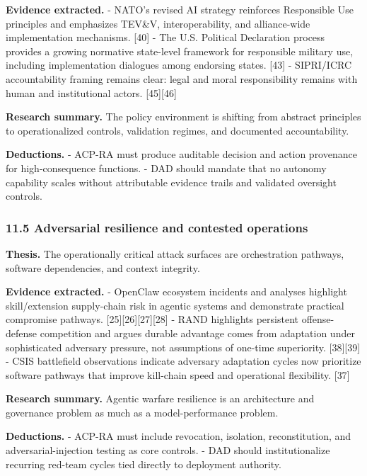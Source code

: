 \documentclass[11pt]{article}
\begin{document}
\textbf{Evidence extracted.} - NATO's revised AI strategy reinforces
Responsible Use principles and emphasizes TEV\&V, interoperability, and
alliance-wide implementation mechanisms. {[}40{]} - The U.S. Political
Declaration process provides a growing normative state-level framework
for responsible military use, including implementation dialogues among
endorsing states. {[}43{]} - SIPRI/ICRC accountability framing remains
clear: legal and moral responsibility remains with human and
institutional actors. {[}45{]}{[}46{]}

\textbf{Research summary.} The policy environment is shifting from
abstract principles to operationalized controls, validation regimes, and
documented accountability.

\textbf{Deductions.} - ACP-RA must produce auditable decision and action
provenance for high-consequence functions. - DAD should mandate that no
autonomy capability scales without attributable evidence trails and
validated oversight controls.

\hypertarget{adversarial-resilience-and-contested-operations}{%
\subsubsection{11.5 Adversarial resilience and contested
operations}\label{adversarial-resilience-and-contested-operations}}

\textbf{Thesis.} The operationally critical attack surfaces are
orchestration pathways, software dependencies, and context integrity.

\textbf{Evidence extracted.} - OpenClaw ecosystem incidents and analyses
highlight skill/extension supply-chain risk in agentic systems and
demonstrate practical compromise pathways.
{[}25{]}{[}26{]}{[}27{]}{[}28{]} - RAND highlights persistent
offense-defense competition and argues durable advantage comes from
adaptation under sophisticated adversary pressure, not assumptions of
one-time superiority. {[}38{]}{[}39{]} - CSIS battlefield observations
indicate adversary adaptation cycles now prioritize software pathways
that improve kill-chain speed and operational flexibility. {[}37{]}

\textbf{Research summary.} Agentic warfare resilience is an architecture
and governance problem as much as a model-performance problem.

\textbf{Deductions.} - ACP-RA must include revocation, isolation,
reconstitution, and adversarial-injection testing as core controls. -
DAD should institutionalize recurring red-team cycles tied directly to
deployment authority.
\end{document}
